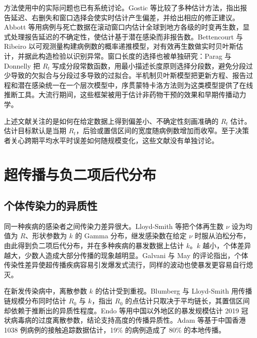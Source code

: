 方法使用中的实际问题也已有系统讨论。Gostic 等比较了多种估计方法，指出报告延迟、右删失和窗口选择会使实时估计产生偏差，并给出相应的修正建议\citep{gostic2020practical}。Abbott 等用病例与死亡数据在滚动窗口内估计全球到地方各级的时变再生数，显式处理报告延迟的不确定性，使估计基于潜在感染而非报告数\citep{abbott2020estimating}。Bettencourt 与 Ribeiro 以可观测量构建病例数的概率递推模型，对有效再生数做实时贝叶斯估计，并据此构造检验以识别异常\citep{bettencourt2008real}。窗口长度的选择也被单独研究：Parag 与 Donnelly 把 $R_t$ 写成分段常数函数，用最小描述长度原则选择分段数，避免分段过少导致的欠拟合与分段过多导致的过拟合\citep{parag2020adaptive}。半机制贝叶斯模型把更新方程、报告过程和潜在感染统一在一个层次模型中\citep{bhatt2023semi}，序贯蒙特卡洛方法则为这类模型提供了在线推断工具\citep{steyn2025primer}。大流行期间，这些框架被用于估计非药物干预的效果\citep{flaxman2020estimating}和早期传播动力学\citep{kucharski2020early}。

上述文献关注的是如何在给定数据上得到偏差小、不确定性刻画准确的 $R_t$ 估计。估计目标默认是当期 $R_t$，后验或置信区间的宽度随病例数增加而收窄。至于决策者关心跨期平均水平时误差如何随规模变化，这些文献没有单独讨论。

\section{超传播与负二项后代分布}
\label{sec:lit-superspreading}

\subsection{个体传染力的异质性}

同一种疾病的感染者之间传染力差异很大。Lloyd-Smith 等把个体再生数 $\nu$ 设为均值为 $R$、形状参数为 $k$ 的 Gamma 分布，继发感染数在给定 $\nu$ 时服从泊松分布，由此得到负二项后代分布，并在多种疾病的暴发数据上估计 $k$\citep{lloydsmith2005superspreading}。$k$ 越小，个体差异越大，少数人造成大部分传播的现象越明显。Galvani 与 May 的评论指出，个体传染性差异使超传播疾病容易引发爆发式流行，同样的波动也使暴发更容易自行熄灭\citep{galvani2005dimensions}。

在新发传染病中，离散参数 $k$ 的估计受到重视。Blumberg 与 Lloyd-Smith 用传播链规模分布同时估计 $R_0$ 与 $k$，指出 $R_0$ 的点估计只取决于平均链长，其置信区间却依赖于推断出的异质性程度\citep{blumberg2013inference}。Endo 等用中国以外地区的暴发规模估计 2019 冠状病毒病的过度离散参数，结论支持高度的传播异质性\citep{endo2020estimating}。Adam 等基于中国香港 1038 例病例的接触追踪数据估计，19\% 的病例造成了 80\% 的本地传播\citep{adam2020clustering}。

